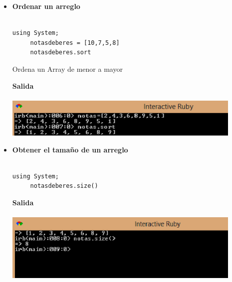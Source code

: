 \documentclass[11pt]{article} %
\begin{document}
\begin{itemize}
     \item {\bf Ordenar un arreglo}\\\\
\begin{lstlisting}[frame=single]  % Start your code-block
using System;
     notasdeberes = [10,7,5,8]
     notasdeberes.sort
\end{lstlisting}
\begin{center}
Ordena un Array de menor a mayor
\end{center}
\bf Salida\\\\
    \includegraphics[width=0.9\textwidth]{./imagenes/OrdenarArreglo}\\


\newpage

    \item  {\bf Obtener el tamaño de un arreglo}\\\\
\begin{lstlisting}[frame=single]  % Start your code-block
using System;
     notasdeberes.size()
\end{lstlisting}
\bf Salida\\\\
        \includegraphics[width=0.9\textwidth]{./imagenes/SizeArreglo}\\\\



\end{itemize}
\end{document}

